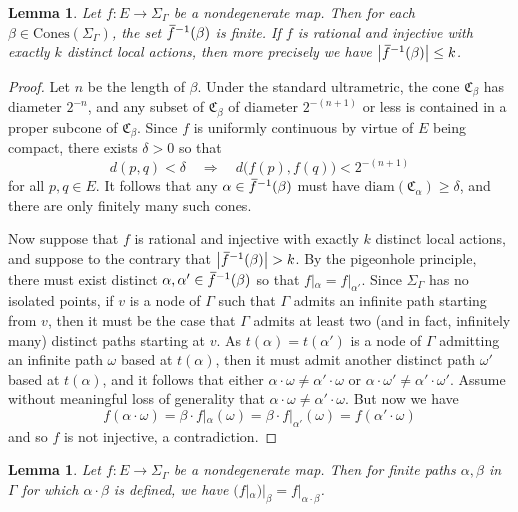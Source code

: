 \documentclass[11pt,letterpaper]{amsart}
\newtheorem{lemma}[theorem]{Lemma}
\theoremstyle{definition}
\newcommand{\C}{\mathfrak{C}}
\newcommand{\Cones}{\mathrm{Cones}}
\newcommand{\of}{\mkern 3.5mu\overline{\mkern-3.5mu f\mkern0.75mu}\mkern-0.75mu}
\begin{document}
\begin{lemma}\label{lem:finite_to_one}
Let $f\colon E\to \Sigma_\Gamma$ be a nondegenerate map.  Then for each $\beta\in\Cones(\Sigma_\Gamma)$, the set $\of^{-1}(\beta)$ is finite.  If $f$ is rational and injective with exactly $k$ distinct local actions, then more precisely we have $\bigl|\of^{-1}(\beta)\bigr|\leq k$.
\end{lemma}
\begin{proof}
Let $n$ be the length of $\beta$.  Under the standard ultrametric, the cone $\C_\beta$ has diameter $2^{-n}$, and any subset of $\C_\beta$ of diameter $2^{-(n+1)}$ or less is contained in a proper subcone of $\C_\beta$. Since $f$ is uniformly continuous by virtue of $E$ being compact, there exists $\delta>0$ so that
\[
d(p,q) < \delta \quad\Rightarrow\quad d\bigl(f(p),f(q)\bigr) < 2^{-(n+1)}
\]
for all $p,q\in E$.  It follows that any $\alpha\in \of^{-1}(\beta)$ must have $\mathrm{diam}(\C_\alpha) \geq \delta$, and there are only finitely many such cones.

Now suppose that $f$ is rational and injective with exactly $k$ distinct local actions, and suppose to the contrary that $\bigl|\of^{-1}(\beta)\bigr|>k$.  By the pigeonhole principle, there must exist distinct $\alpha,\alpha'\in \of^{-1}(\beta)$ so that $f|_\alpha=f|_{\alpha'}$. Since $\Sigma_{\Gamma}$ has no isolated points, if $v$ is a node of $\Gamma$ such that $\Gamma$ admits an infinite path starting from $v$, then it must be the case that $\Gamma$ admits at least two (and in fact, infinitely many) distinct paths starting at $v$. As $t(\alpha)=t(\alpha')$ is a node of $\Gamma$ admitting an infinite path $\omega$ based at $t(\alpha)$, then it must admit another distinct path $\omega'$ based at $t(\alpha)$, and it follows that either $\alpha\cdot\omega\neq \alpha'\cdot\omega$ or $\alpha\cdot\omega'\neq \alpha'\cdot\omega'$.  Assume without meaningful loss of generality that $\alpha\cdot\omega\neq \alpha'\cdot\omega$. But now we have
\[
f(\alpha\cdot\omega) = \beta\cdot f|_{\alpha}(\omega) = \beta\cdot f|_{\alpha'}(\omega) = f(\alpha'\cdot \omega)
\]
and so $f$ is not injective, a contradiction.
\end{proof}


\begin{lemma}\label{lem:restrict_twice}
Let $f\colon E\to \Sigma_\Gamma$ be a nondegenerate map.  Then for finite paths $\alpha,\beta$ in\/ $\Gamma$ for which $\alpha\cdot\beta$ is defined, we have $(f|_\alpha)|_\beta = f|_{\alpha\cdot\beta}$.
\end{lemma}
\end{document}
